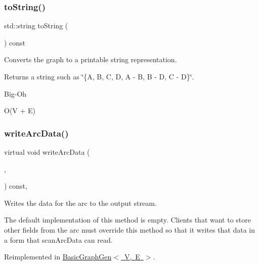 \subsubsection{\texorpdfstring{to\+String()}{toString()}}
{\footnotesize\ttfamily std\+::string to\+String (\begin{DoxyParamCaption}{ }\end{DoxyParamCaption}) const}



Converts the graph to a printable string representation. 

\begin{DoxyReturn}{Returns}
a string such as {\ttfamily \char`\"{}\{\+A, B, C, D, A -\/ B, B -\/ D, C -\/ D\}\char`\"{}}. 
\end{DoxyReturn}
\begin{DoxyRefDesc}{Big-\/\+Oh}
\item[\mbox{\hyperlink{BigOh__BigOh000090}{Big-\/\+Oh}}]O(V + E) \end{DoxyRefDesc}
\mbox{\label{classGraph_ac9ab61a83ff4792f63e9e110b534cdfd}} 
\subsubsection{\texorpdfstring{write\+Arc\+Data()}{writeArcData()}}
{\footnotesize\ttfamily virtual void write\+Arc\+Data (\begin{DoxyParamCaption}\item[{std\+::ostream \&}]{,  }\item[{Arc\+Type $\ast$}]{ }\end{DoxyParamCaption}) const\hspace{0.3cm}{\ttfamily [inline]}, {\ttfamily [virtual]}}



Writes the data for the arc to the output stream. 

The default implementation of this method is empty. Clients that want to store other fields from the arc must override this method so that it writes that data in a form that scan\+Arc\+Data can read. 

Reimplemented in \mbox{\hyperlink{classBasicGraphGen_ae7be688f4ddbd7da8eb2a8c7eef8901c}{Basic\+Graph\+Gen$<$ V, E $>$}}.

\mbox{\label{classGraph_ac0db5231476c8cb10655d58ebc108b78}} 
